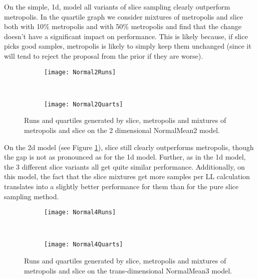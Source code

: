 On the simple, 1d, model all variants of slice sampling clearly outperform metropolis. In the quartile graph we consider mixtures of metropolis and slice both with 10\% metropolis and with 50\% metropolis and find that the change doesn't have a significant impact on performance. This is likely because, if slice picks good samples, metropolis is likely to simply keep them unchanged (since it will tend to reject the proposal from the prior if they are worse).

\begin{figure}[h]
        \centering
        \begin{subfigure}[b]{0.48\textwidth}
                \centering
                \texttt{[image: Normal2Runs]}
        \end{subfigure}
        ~ 
        \begin{subfigure}[b]{0.48\textwidth}
                \centering
                \texttt{[image: Normal2Quarts]}
        \end{subfigure}
    \caption{Runs and quartiles generated by slice, metropolis and mixtures of metropolis and slice on the 2 dimensional NormalMean2 model.}
    \label{fig:normal2Perf}
\end{figure}

On the 2d model (see Figure \ref{fig:normal2Perf}), slice still clearly outperforms metropolis, though the gap is not as pronounced as for the 1d model. Further, as in the 1d model, the 3 different slice variants all get quite similar performance. Additionally, on this model, the fact that the slice mixtures get more samples per LL calculation translates into a slightly better performance for them than for the pure slice sampling method.

\begin{figure}[h]
        \centering
        \begin{subfigure}[b]{0.48\textwidth}
                \centering
                \texttt{[image: Normal4Runs]}
        \end{subfigure}
        ~ 
        \begin{subfigure}[b]{0.48\textwidth}
                \centering
                \texttt{[image: Normal4Quarts]}
        \end{subfigure}
    \caption{Runs and quartiles generated by slice, metropolis and mixtures of metropolis and slice on the trans-dimensional NormalMean3 model.}
    \label{fig:normal4Perf}
\end{figure}

